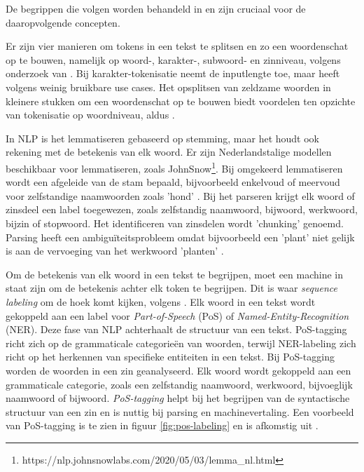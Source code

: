 \medspace

De begrippen die volgen worden behandeld in \textcite{Sohom2019, Eisenstein2019} en zijn cruciaal voor de daaropvolgende concepten.

\medspace

Er zijn vier manieren om tokens in een tekst te splitsen en zo een woordenschat op te bouwen, namelijk op woord-, karakter-, subwoord- en zinniveau, volgens onderzoek van \textcite{Menzli2023}. Bij karakter-tokenisatie neemt de inputlengte toe, maar heeft volgens \textcite{Ribeiro2018} weinig bruikbare use cases. Het opsplitsen van zeldzame woorden in kleinere stukken om een woordenschat op te bouwen biedt voordelen ten opzichte van tokenisatie op woordniveau, aldus \autocite{Iredale2022}.

\medspace

In NLP is het lemmatiseren gebaseerd op stemming, maar het houdt ook rekening met de betekenis van elk woord. Er zijn Nederlandstalige modellen beschikbaar voor lemmatiseren, zoals JohnSnow\footnote{https://nlp.johnsnowlabs.com/2020/05/03/lemma\_nl.html}. Bij omgekeerd lemmatiseren wordt een afgeleide van de stam bepaald, bijvoorbeeld enkelvoud of meervoud voor zelfstandige naamwoorden zoals 'hond' \autocite{Eisenstein2019}. Bij het parseren krijgt elk woord of zinsdeel een label toegewezen, zoals zelfstandig naamwoord, bijwoord, werkwoord, bijzin of stopwoord. Het identificeren van zinsdelen wordt 'chunking' genoemd. Parsing heeft een ambiguïteitsprobleem omdat bijvoorbeeld een 'plant' niet gelijk is aan de vervoeging van het werkwoord 'planten' \autocite{Eisenstein2019}.

\medspace

Om de betekenis van elk woord in een tekst te begrijpen, moet een machine in staat zijn om de betekenis achter elk token te begrijpen. Dit is waar \textit{sequence labeling} om de hoek komt kijken, volgens \textcite{Eisenstein2019}. Elk woord in een tekst wordt gekoppeld aan een label voor \textit{Part-of-Speech} (PoS) of \textit{Named-Entity-Recognition} (NER). Deze fase van NLP achterhaalt de structuur van een tekst. PoS-tagging richt zich op de grammaticale categorieën van woorden, terwijl NER-labeling zich richt op het herkennen van specifieke entiteiten in een tekst. Bij PoS-tagging worden de woorden in een zin geanalyseerd. Elk woord wordt gekoppeld aan een grammaticale categorie, zoals een zelfstandig naamwoord, werkwoord, bijvoeglijk naamwoord of bijwoord. \textit{PoS-tagging} helpt bij het begrijpen van de syntactische structuur van een zin en is nuttig bij parsing en machinevertaling. Een voorbeeld van PoS-tagging is te zien in figuur \ref{fig:pos-labeling} en is afkomstig uit \textcite{Bilisci2021}.

